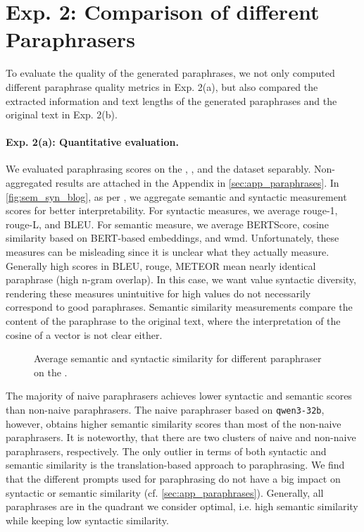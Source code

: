 \section{Exp. 2: Comparison of different Paraphrasers}

To evaluate the quality of the generated paraphrases, we not only computed different paraphrase quality metrics in Exp. 2(a), but also compared the extracted information and text lengths of the generated paraphrases and the original text in Exp. 2(b).

\paragraph{Exp. 2(a): Quantitative evaluation.}

We evaluated paraphrasing scores on the \dataBlog{}, \dataGutenberg{}, and the \dataStudent{} dataset separably.
Non-aggregated results are attached in the Appendix in \autoref{sec:app_paraphrases}.
In \autoref{fig:sem_syn_blog}, as per \citet{gohsen_captions_2023}, we aggregate semantic and syntactic measurement scores for better interpretability.
For syntactic measures, we average \ac{rouge}-1, \ac{rouge}-L, and BLEU.
For semantic measure, we average BERTScore, cosine similarity based on BERT-based embeddings, and \ac{wmd}.
Unfortunately, these measures can be misleading since it is unclear what they actually measure.
Generally high scores in BLEU, \ac{rouge}, METEOR mean nearly identical paraphrase (high n-gram overlap).
In this case, we want value syntactic diversity, rendering these measures unintuitive 
for high values do not necessarily correspond to good paraphrases.
Semantic similarity measurements compare the content of the paraphrase to the original text, 
where the interpretation of the cosine of a vector is not clear either.

\begin{figure}[htbp]
    \centering
    
    \caption{Average semantic and syntactic similarity for different paraphraser on the \dataBlog{}.}
    \label{fig:sem_syn_blog}
\end{figure}


The majority of naive paraphrasers achieves lower syntactic and semantic scores than non-naive paraphrasers.
The naive paraphraser based on \texttt{qwen3-32b}, however, obtains higher semantic similarity scores than most of the non-naive paraphrasers.
It is noteworthy, that there are two clusters of naive and non-naive paraphrasers, respectively.
The only outlier in terms of both syntactic and semantic similarity is the translation-based approach to paraphrasing.
We find that the different prompts used for paraphrasing do not have a big impact on syntactic or semantic similarity (cf. \autoref{sec:app_paraphrases}).
Generally, all paraphrases are in the quadrant we consider optimal, i.e. high semantic similarity while keeping low syntactic similarity.


